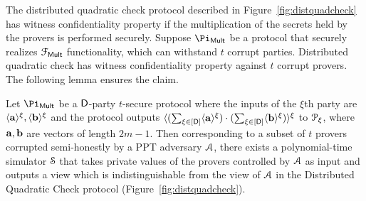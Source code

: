 The distributed quadratic check protocol described in Figure~\ref{fig:distquadcheck} has witness confidentiality property if the multiplication of the secrets held by the provers is performed securely. Suppose $\Pi_{\sf Mult}$ be a protocol that securely realizes $\mathcal{F}_{\sf Mult}$ functionality, which can withstand $t$ corrupt parties. Distributed quadratic check has witness confidentiality property against $t$ corrupt provers. The following lemma ensures the claim. 
\begin{lemma}\label{lem:WHquad}
	Let $\Pi_{\sf Mult}$ be a $\mathsf{D}$-party $t$-secure protocol where the inputs of the $\xi$th party are $\langle{\bf a}\rangle^\xi, \langle{\bf b}\rangle^\xi$ and the protocol outputs $\langle{(\sum_{\xi\in[\mathsf{D}]} \langle{\bf a}\rangle^\xi) \cdot (\sum_{\xi\in[\mathsf{D}]} \langle{\bf b}\rangle^\xi)}\rangle^\xi$ to $\mathcal{P}_\xi$, where ${\bf a}, {\bf b}$ are vectors of length $2m-1$. Then corresponding to a subset of $t$ provers corrupted semi-honestly by a PPT adversary $\mathcal{A}$, there exists a polynomial-time simulator $\mathcal{S}$ that takes private values of the provers controlled by $\mathcal{A}$ as input and outputs a view which is indistinguishable from the view of $\mathcal{A}$ in the Distributed Quadratic Check protocol (Figure~\ref{fig:distquadcheck}).
\end{lemma}
